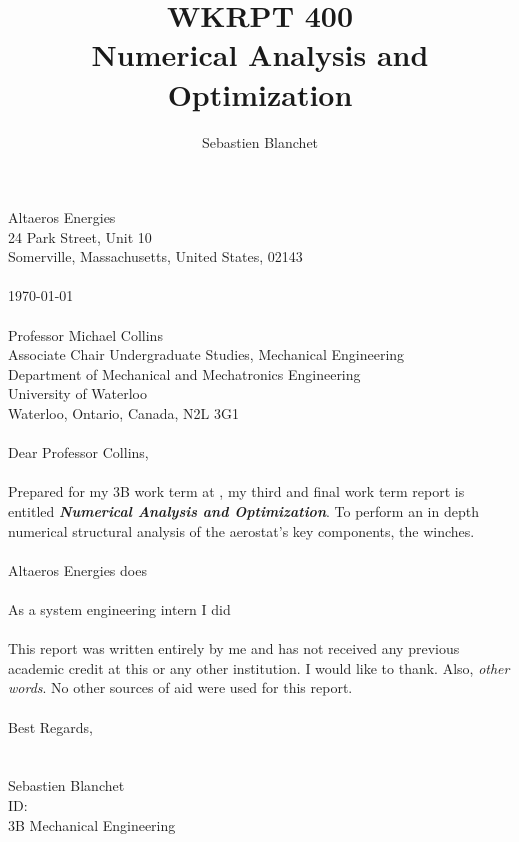 \newcommand{\Company}{Altaeros Energies }
\newcommand{\Term}{3B }
\newcommand{\Seb}{Sebastien Blanchet }
\newcommand{\ReportTitle}{Numerical Analysis and Optimization}


\title[WKRPT 400]{WKRPT 400\\ \ReportTitle}%
\author{\Seb}
\preparedfor{\Company}
\maketitle
\begin{declaration}
    \noindent
	\Company\\
	24 Park Street, Unit 10\\
	Somerville, Massachusetts, United States, 02143\\
	\\  
    \noindent  	
    \today \\
  	\\  
    \noindent
    Professor Michael Collins\\
	Associate Chair Undergraduate Studies, Mechanical Engineering\\
	Department of Mechanical and Mechatronics Engineering\\
	University of Waterloo\\
	Waterloo, Ontario, Canada, N2L 3G1\\	\\
    \noindent
    Dear Professor Collins,\\ \\
	\noindent
    Prepared for my \Term work term at , my third and final work term report is
	entitled \textbf{\emph{\ReportTitle}}. To perform an in depth numerical structural analysis of the aerostat's key components, the winches.\\ \\
	\noindent	
	\Company  does\\\\
	\noindent
	As a system engineering intern I did\\ \\
	\noindent
	This report was written entirely by me and has not received any previous academic credit at this or
	any other institution. I would like to thank. Also, \emph{other words}. No other sources of aid were used for this report.\\ \\
	\noindent
	Best Regards,\\
	\\
	\\
	\noindent
	\Seb\\
	ID: \\
	\Term Mechanical Engineering
	
\end{declaration}
